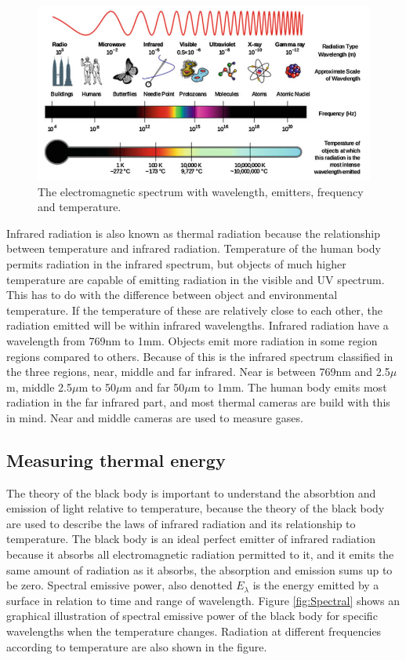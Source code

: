 \begin{figure}[H]                                         
	\includegraphics[width=.66\textwidth]{figures/em_spectrum}  
	\caption{The electromagnetic spectrum with wavelength, emitters, frequency and temperature.\cite{ignacio2017}}
	\label{fig:em_spectrum}  
\end{figure}   

Infrared radiation is also known as thermal radiation because the relationship between temperature and infrared radiation. Temperature of the human body permits radiation in the infrared spectrum, but objects of much higher temperature are capable of emitting radiation in the visible and UV spectrum. This has to do with the difference between object and environmental temperature. If the temperature of these are relatively close to each other, the radiation emitted will be within infrared wavelengths. Infrared radiation have a wavelength from 769nm to 1mm. Objects emit more radiation in some region regions compared to others. Because of this is the infrared spectrum classified in the three regions, near, middle and far infrared. Near is between 769nm and 2.5$\mu$m, middle 2.5$\mu$m to 50$\mu$m and far 50$\mu$m to 1mm. The human body emits most radiation in the far infrared part, and most thermal cameras are build with this in mind. Near and middle cameras are used to measure gases.\cite{ignacio2017} 


\subsection{Measuring thermal energy}

The theory of the black body is important to understand the absorbtion and emission of light relative to temperature, because the theory of the black body are used to describe the laws of infrared radiation and its relationship to temperature. The black body is an ideal perfect emitter of infrared radiation because it absorbs all electromagnetic radiation permitted to it, and it emits the same amount of radiation as it absorbs, the absorption and emission sums up to be zero. 
Spectral emissive power, also denotted $E_\lambda$ is the energy emitted by a surface in relation to time and range of wavelength. Figure \ref{fig:Spectral} shows an graphical illustration of spectral emissive power of the black body for specific wavelengths when the temperature changes. Radiation at different frequencies according to temperature are also shown in the figure. 

